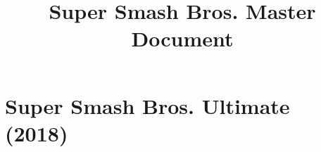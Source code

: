 \documentclass[a4paper]{article}
\title{Super Smash Bros. Master Document}
\begin{document}
	
	\maketitle\thispagestyle{empty}
	
	\newpage
	
	\tableofcontents
	
	\newpage
	
	\section{Super Smash Bros. Ultimate (2018)}
	
	
\end{document}
